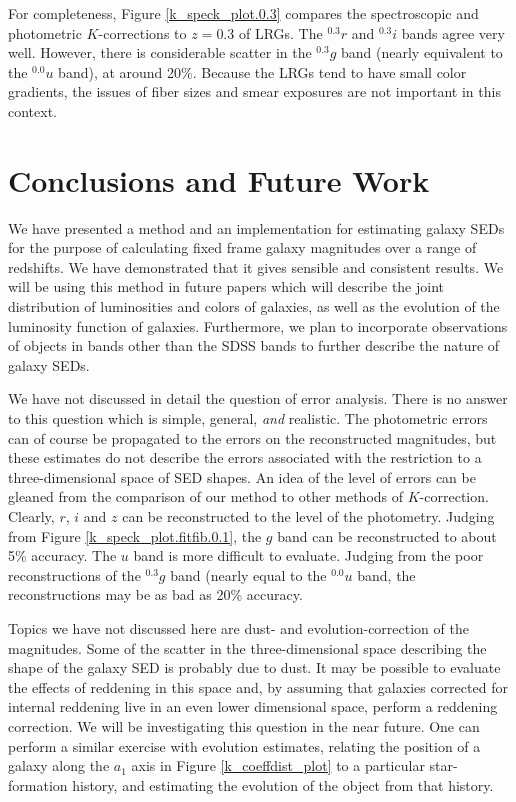 \documentclass[10pt,preprint]{aastex}
\newcommand{\band}[2]{\ensuremath{^{{#1}}\!{#2}}}
\begin{document}
For completeness, Figure \ref{k_speck_plot.0.3} compares the
spectroscopic and photometric $K$-corrections to $z=0.3$ of LRGs. The
\band{0.3}{r} and \band{0.3}{i} bands agree very well. However, there
is considerable scatter in the \band{0.3}{g} band (nearly equivalent
to the \band{0.0}{u} band), at around 20\%. Because the LRGs tend to
have small color gradients, the issues of fiber sizes and smear
exposures are not important in this context.

\section{Conclusions and Future Work}
\label{conclusions}

We have presented a method and an implementation for estimating galaxy
SEDs for the purpose of calculating fixed frame galaxy magnitudes over
a range of redshifts. We have demonstrated that it gives sensible and
consistent results. We will be using this method in future papers
which will describe the joint distribution of luminosities and colors
of galaxies, as well as the evolution of the luminosity function of
galaxies. Furthermore, we plan to incorporate observations of objects
in bands other than the SDSS bands to further describe the nature of
galaxy SEDs.

We have not discussed in detail the question of error analysis. There
is no answer to this question which is simple, general, {\it and}
realistic. The photometric errors can of course be propagated to the
errors on the reconstructed magnitudes, but these estimates do not
describe the errors associated with the restriction to a
three-dimensional space of SED shapes. An idea of the level of errors
can be gleaned from the comparison of our method to other methods of
$K$-correction. Clearly, $r$, $i$ and $z$ can be reconstructed to the
level of the photometry. Judging from Figure
\ref{k_speck_plot.fitfib.0.1}, the $g$ band can be reconstructed to
about 5\% accuracy. The $u$ band is more difficult to evaluate.
Judging from the poor reconstructions of the $\band{0.3}{g}$ band
(nearly equal to the $\band{0.0}{u}$ band, the reconstructions may be
as bad as 20\% accuracy.

Topics we have not discussed here are dust- and evolution-correction
of the magnitudes. Some of the scatter in the three-dimensional space
describing the shape of the galaxy SED is probably due to dust. It may
be possible to evaluate the effects of reddening in this space and, by
assuming that galaxies corrected for internal reddening live in an
even lower dimensional space, perform a reddening correction. We will
be investigating this question in the near future. One can perform a
similar exercise with evolution estimates, relating the position of a
galaxy along the $a_1$ axis in Figure \ref{k_coeffdist_plot} to a
particular star-formation history, and estimating the evolution of the
object from that history.
\end{document}

